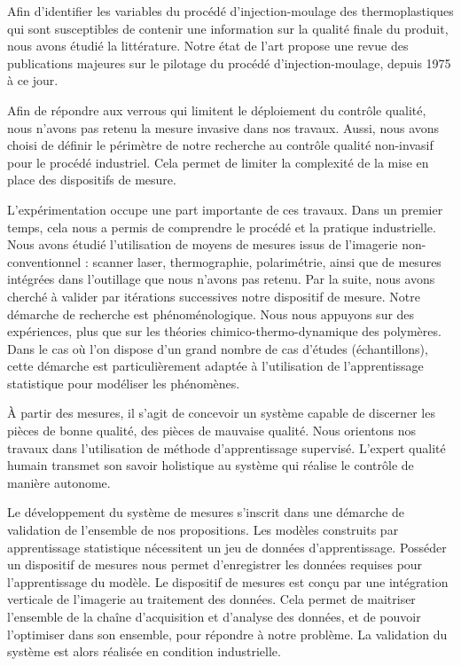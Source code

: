 Afin d'identifier les variables du procédé d'injection-moulage des thermoplastiques qui sont susceptibles de contenir une information sur la qualité finale du produit, nous avons étudié la littérature.
Notre état de l'art propose une revue des publications majeures sur le pilotage du procédé d'injection-moulage, depuis 1975 à ce jour.

Afin de répondre aux verrous qui limitent le déploiement du contrôle qualité, nous n'avons pas retenu la mesure invasive dans nos travaux.
Aussi, nous avons choisi de définir le périmètre de notre recherche au contrôle qualité non-invasif pour le procédé industriel.
Cela permet de limiter la complexité de la mise en place des dispositifs de mesure.

L'expérimentation occupe une part importante de ces travaux.
Dans un premier temps, cela nous a permis de comprendre le procédé et la pratique industrielle.
Nous avons étudié l'utilisation de moyens de mesures issus de l'imagerie non-conventionnel : scanner laser, thermographie, polarimétrie, ainsi que de mesures intégrées dans l'outillage que nous n'avons pas retenu.
Par la suite, nous avons cherché à valider par itérations successives notre dispositif de mesure.
Notre démarche de recherche est phénoménologique.
Nous nous appuyons sur des expériences, plus que sur les théories chimico-thermo-dynamique des polymères.
Dans le cas où l'on dispose d'un grand nombre de cas d'études (échantillons), cette démarche est particulièrement adaptée à l'utilisation de l'apprentissage statistique pour modéliser les phénomènes.

À partir des mesures, il s'agit de concevoir un système capable de discerner les pièces de bonne qualité, des pièces de mauvaise qualité.
Nous orientons nos travaux dans l'utilisation de méthode d'apprentissage supervisé.
L'expert qualité humain transmet son savoir holistique au système qui réalise le contrôle de manière autonome.

Le développement du système de mesures s'inscrit dans une démarche de validation de l'ensemble de nos propositions.
Les modèles construits par apprentissage statistique nécessitent un jeu de données d'apprentissage.
Posséder un dispositif de mesures nous permet d'enregistrer les données requises pour l'apprentissage du modèle.
Le dispositif de mesures est conçu par une intégration verticale de l'imagerie au traitement des données.
Cela permet de maitriser l'ensemble de la chaîne d'acquisition et d'analyse des données, et de pouvoir l'optimiser dans son ensemble, pour répondre à notre problème.
La validation du système est alors réalisée en condition industrielle.

